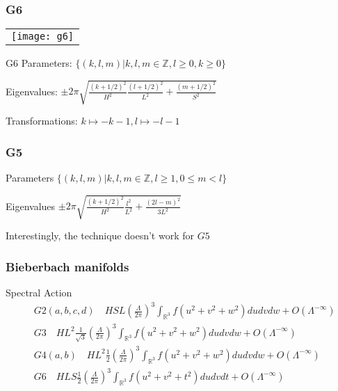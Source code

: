 \documentclass{beamer}
\def\Z{{\mathbb Z}}
\def\R{{\mathbb R}}
\begin{document}
\begin{frame}
\frametitle{G6}
    \begin{tabular}[]{l}
	\texttt{[image: g6]}\\
    \end{tabular}
    \begin{block}{G6}
      Parameters: $\{(k,l,m)| k,l,m \in \Z, l \geq 0, k\geq 0\}$

      Eigenvalues: $\pm 2\pi\sqrt{\frac{(k+1/2)^2}{H^2}\frac{(l+1/2)^2}{L^2} + \frac{(m + 1/2)^2}{S^2}}$
      
      Transformations: $k\mapsto -k - 1, l \mapsto -l -1$
    \end{block}
\end{frame}

\begin{frame}
  \frametitle{G5}
  \begin{block}{Parameters}
    $\{(k,l,m)| k,l,m \in \Z, l \geq 1, 0 \leq m < l\}$
  \end{block}

  \begin{block}{Eigenvalues}
    $\pm 2\pi\sqrt{\frac{(k+1/2)^2}{H^2}\frac{l^2}{L^2} + \frac{(2l- m)^2}{3L^2}}$
  \end{block}

  \pause

  \begin{block}{}
    Interestingly, the technique doesn't work for $G5$
  \end{block}
\end{frame}

\begin{frame}
\frametitle{Bieberbach manifolds}
\begin{block}{Spectral Action}
\begin{align*}
&G2(a,b,c,d) \quad HSL(\frac{\Lambda}{2\pi})^3 \int_{\R ^3} f(u^2 +v^2 + w^2)dudvdw + O(\Lambda^{-\infty})\\
&G3 \quad HL^2 \frac{1}{\sqrt{3}}(\frac{\Lambda}{2\pi})^3 \int_{\R ^3} f(u^2 +v^2 + w^2)dudvdw + O(\Lambda^{-\infty})\\
&G4(a,b) \quad HL^2 \frac{1}{2}(\frac{\Lambda}{2\pi})^3 \int_{\R ^3} f(u^2 +v^2 + w^2)dudvdw + O(\Lambda^{-\infty})\\
&G6 \quad HLS \frac{1}{2}(\frac{\Lambda}{2\pi})^3 \int_{\R ^3} f(u^2 +v^2 + t^2)dudvdt + O(\Lambda^{-\infty})\\
\end{align*}
\end{block}
\end{frame}
\end{document}
